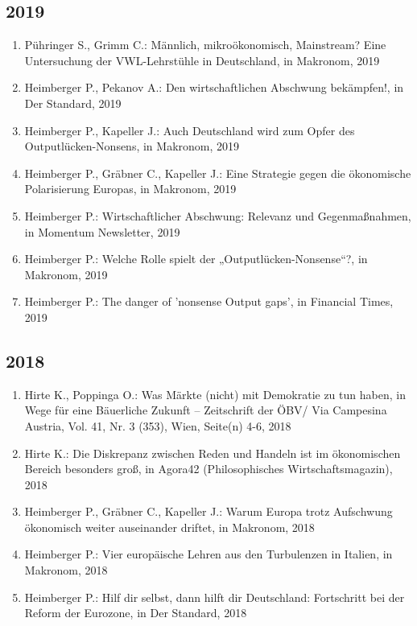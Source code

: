 \subsection*{2019}
\begin{enumerate}
    	 \item Pühringer S., Grimm C.: Männlich, mikroökonomisch, Mainstream? Eine Untersuchung der VWL-Lehrstühle in Deutschland, in Makronom, 2019
	 \item Heimberger P., Pekanov A.: Den wirtschaftlichen Abschwung bekämpfen!, in Der Standard, 2019
	 \item Heimberger P., Kapeller J.: Auch Deutschland wird zum Opfer des \glqq Outputlücken-Nonsens\grqq{}, in Makronom, 2019
	 \item Heimberger P., Gräbner C., Kapeller J.: Eine Strategie gegen die ökonomische Polarisierung Europas, in Makronom, 2019
	 \item Heimberger P.: Wirtschaftlicher Abschwung: Relevanz und Gegenmaßnahmen, in Momentum Newsletter, 2019
	 \item Heimberger P.: Welche Rolle spielt der „Outputlücken-Nonsense“?, in Makronom, 2019
	 \item Heimberger P.: The danger of  'nonsense Output gaps', in Financial Times, 2019
\end{enumerate}
\subsection*{2018}
\begin{enumerate}
    	 \item Hirte K., Poppinga O.: Was Märkte (nicht) mit Demokratie zu tun haben, in Wege für eine Bäuerliche Zukunft – Zeitschrift der ÖBV/ Via Campesina Austria, Vol. 41, Nr. 3 (353), Wien, Seite(n) 4-6, 2018
	 \item Hirte K.: Die Diskrepanz zwischen Reden und Handeln ist im ökonomischen Bereich besonders groß, in Agora42 (Philosophisches Wirtschaftsmagazin), 2018
	 \item Heimberger P., Gräbner C., Kapeller J.: Warum Europa trotz Aufschwung ökonomisch weiter auseinander driftet, in Makronom, 2018
	 \item Heimberger P.: Vier europäische Lehren aus den Turbulenzen in Italien, in Makronom, 2018
	 \item Heimberger P.: Hilf dir selbst, dann hilft dir Deutschland: Fortschritt bei der Reform der Eurozone, in Der Standard, 2018
\end{enumerate}
